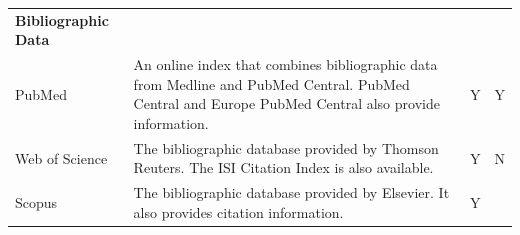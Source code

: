 \documentclass[]{krantz}
\begin{document}
\begin{longtable}[]{@{}llcc@{}}
\begin{minipage}[t]{0.74\columnwidth}
\textbf{Bibliographic Data}\strut
\end{minipage} & \begin{minipage}[t]{0.02\columnwidth}\centering\strut
\strut
\end{minipage} & \begin{minipage}[t]{0.02\columnwidth}\centering\strut
\strut
\end{minipage}\tabularnewline
\begin{minipage}[t]{0.10\columnwidth}\raggedright\strut
PubMed\strut
\end{minipage} & \begin{minipage}[t]{0.74\columnwidth}\raggedright\strut
An online index that combines bibliographic data from Medline and PubMed
Central. PubMed Central and Europe PubMed Central also provide
information.\strut
\end{minipage} & \begin{minipage}[t]{0.02\columnwidth}\centering\strut
Y\strut
\end{minipage} & \begin{minipage}[t]{0.02\columnwidth}\centering\strut
Y\strut
\end{minipage}\tabularnewline
\begin{minipage}[t]{0.10\columnwidth}\raggedright\strut
Web of Science\strut
\end{minipage} & \begin{minipage}[t]{0.74\columnwidth}\raggedright\strut
The bibliographic database provided by Thomson Reuters. The ISI Citation
Index is also available.\strut
\end{minipage} & \begin{minipage}[t]{0.02\columnwidth}\centering\strut
Y\strut
\end{minipage} & \begin{minipage}[t]{0.02\columnwidth}\centering\strut
N\strut
\end{minipage}\tabularnewline
\begin{minipage}[t]{0.10\columnwidth}\raggedright\strut
Scopus\strut
\end{minipage} & \begin{minipage}[t]{0.74\columnwidth}\raggedright\strut
The bibliographic database provided by Elsevier. It also provides
citation information.\strut
\end{minipage} & \begin{minipage}[t]{0.02\columnwidth}\centering\strut
Y\strut
\end{minipage} & \begin{minipage}[t]{0.02\columnwidth}\centering\strut

\end{minipage}
\end{longtable}
\end{document}
